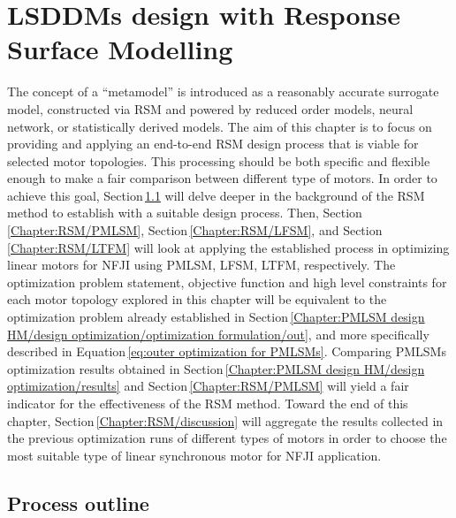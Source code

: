 \chapter{\acsp{LSDDM} design with Response Surface Modelling}   \label{Chapter:PMLSM design RSM}


    The concept of a “metamodel” is introduced as a reasonably accurate surrogate model, constructed via \acf{RSM} and powered by reduced order models, neural network, or statistically derived models. The aim of this chapter is to focus on providing and applying an end-to-end \acs{RSM} design process that is viable for selected motor topologies. This processing should be both specific and flexible enough to make a fair comparison between different type of motors. In order to achieve this goal, Section\,\ref{Chapter:RSM/outline} will delve deeper in the background of the \acs{RSM} method to establish with a suitable design process. Then, Section\,\ref{Chapter:RSM/PMLSM}, Section\,\ref{Chapter:RSM/LFSM}, and Section\,\ref{Chapter:RSM/LTFM} will look at applying the established process in optimizing linear motors for \acs{NFJI} using \acf{PMLSM}, \acf{LFSM}, \acf{LTFM}, respectively. The optimization problem statement, objective function and high level constraints for each motor topology explored in this chapter will be equivalent to the optimization problem already established in Section\,\ref{Chapter:PMLSM design HM/design optimization/optimization formulation/out}, and more specifically  described in Equation\,\ref{eq:outer optimization for PMLSMs}. Comparing \acsp{PMLSM} optimization results obtained in Section\,\ref{Chapter:PMLSM design HM/design optimization/results} and Section\,\ref{Chapter:RSM/PMLSM} will yield a fair indicator for the effectiveness of the \ac{RSM} method. Toward the end of this chapter, Section\,\ref{Chapter:RSM/discussion} will aggregate the results collected in the previous optimization runs of different types of motors in order to choose the most suitable type of linear synchronous motor for \acs{NFJI} application.


    \section{Process outline}                        \label{Chapter:RSM/outline}
    
